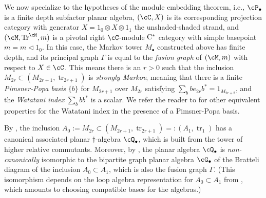 \documentclass[11pt]{article}
\theoremstyle{plain}
\theoremstyle{definition}
\DeclareMathOperator{\Tr}{Tr}
\DeclareMathOperator{\tr}{tr}
\newcommand{\Cstar}{\rm{C^*}}
\begin{document}
We now specialize to the hypotheses of the module embedding theorem, i.e., $\cP_\bullet$ is a finite depth subfactor planar algebra, $(\cC, X)$ is its corresponding projection category with generator $X= 1_0 \otimes X \otimes 1_1$ the unshaded-shaded strand, and $(\cM, \Tr^\cM, m)$ is a pivotal right $\cC$-module $\Cstar$ category with simple basepoint $m = m\vartriangleleft 1_0$.
In this case, the Markov tower $M_\bullet$ constructed above has finite depth, and its principal graph $\Gamma$ is equal to the \emph{fusion graph} of $(\cM,m)$ with respect to $X\in \cC$.
This means there is an $r>0$ such that the inclusion $M_{2r} \subset (M_{2r+1}, \tr_{2r+1})$ is \emph{strongly Markov}, meaning that there is a finite \emph{Pimsner-Popa basis} $\{b\}$ for $M_{2r+1}$ over $M_{2r}$ satisfying $\sum_b be_{2r} b^* = 1_{M_{2r+2}}$, and the \emph{Watatani index} $\sum_b bb^*$ \cite{MR996807} is a scalar.
We refer the reader to \cite[1.1.4(c)]{MR1278111} for other equivalent properties for the Watatani index in the presence of a Pimsner-Popa basis. 

By \cite[\S2.3]{MR2812459}, the inclusion $A_0:=M_{2r} \subset (M_{2r+1}, \tr_{2r+1}) =: (A_1, \tr_1)$ has a canonical associated planar $\dag$-algebra $\cQ_\bullet$, which is built from the tower of higher relative commutants.
Moreover, by \cite[Thm.~3.8]{MR2812459}, the planar algebra $\cQ_\bullet$ is \emph{non-canonically} isomorphic to the bipartite graph planar algebra $\cG_\bullet$ of the Bratteli diagram of the inclusion $A_0 \subset A_1$, which is also the fusion graph $\Gamma$. 
(This isomorphism depends on the loop algebra representation for $A_0 \subset A_1$ from \cite[\S3.1]{MR2812459}, which amounts to choosing compatible bases for the algebras.)

\end{document}
